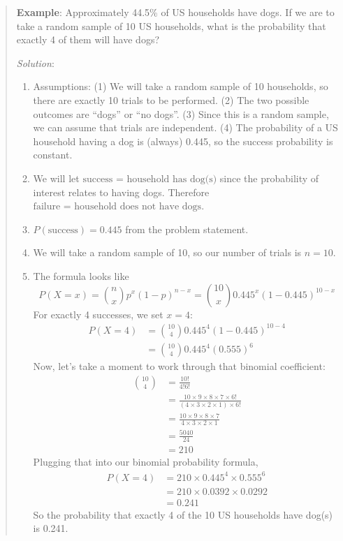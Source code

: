 \documentclass[
]{book}
\providecommand{\tightlist}{%
  \setlength{\itemsep}{0pt}\setlength{\parskip}{0pt}}
\begin{document}
\begin{quote}
\textbf{Example}: Approximately 44.5\% of US households have dogs. If we are to take a random sample of 10 US households, what is the probability that exactly 4 of them will have dogs?

\emph{Solution}:

\begin{enumerate}
\def\labelenumi{\arabic{enumi}.}
\tightlist
\item
  Assumptions: (1) We will take a random sample of 10 households, so there are exactly 10 trials to be performed. (2) The two possible outcomes are ``dogs'' or ``no dogs''. (3) Since this is a random sample, we can assume that trials are independent. (4) The probability of a US household having a dog is (always) 0.445, so the success probability is constant.
\item
  We will let \(\text{success = household has dog(s)}\) since the probability of interest relates to having dogs. Therefore \(\text{failure = household does not have dogs}\).
\item
  \(P(\text{success}) = 0.445\) from the problem statement.
\item
  We will take a random sample of 10, so our number of trials is \(n=10\).
\item
  The formula looks like \[P(X=x) = \binom{n}{x}p^x(1-p)^{n-x} = \binom{10}{x}0.445^x(1-0.445)^{10-x}\] For exactly 4 successes, we set \(x=4\): \[\begin{aligned}P(X=4) &= \binom{10}{4}0.445^4(1-0.445)^{10-4} \\ &=\binom{10}{4}0.445^4(0.555)^{6}\end{aligned} \]
  Now, let's take a moment to work through that binomial coefficient: \[\begin{aligned}\binom{10}{4} &= \frac{10!}{4!6!} \\ &= \frac{10\times 9 \times 8 \times 7 \times 6!}{(4 \times 3 \times 2 \times 1)\times 6!} \\ &= \frac{10\times 9 \times 8 \times 7}{4 \times 3 \times 2 \times 1} \\ &= \frac{5040}{24} \\ &= 210
  \end{aligned}\]
  Plugging that into our binomial probability formula,
  \[\begin{aligned}P(X=4) &=210\times 0.445^4 \times 0.555^{6} \\ &= 210 \times 0.0392 \times 0.0292 \\ &= 0.241 \end{aligned}\]
  So the probability that exactly 4 of the 10 US households have dog(s) is 0.241.
\end{enumerate}
\end{quote}
\end{document}
